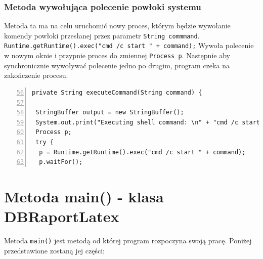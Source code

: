 \subsubsection*{Metoda wywołująca polecenie powłoki systemu}


Metoda ta ma na celu uruchomić nowy proces, którym będzie wywołanie komendy powłoki przesłanej przez parametr \texttt{String commmand}. \texttt{Runtime.getRuntime().exec("cmd /c start " + command);} Wywoła polecenie w nowym oknie i przypnie proces do zmiennej \texttt{Process p}. Następnie aby synchronicznie wywoływać polecenie jedno po drugim, program czeka na zakończenie procesu. 

 \begin{lstlisting}[numbers=left,firstnumber=56]
private String executeCommand(String command) {
 
 StringBuffer output = new StringBuffer();
 System.out.print("Executing shell command: \n" + "cmd /c start " + command);
 Process p;
 try {
  p = Runtime.getRuntime().exec("cmd /c start " + command);
  p.waitFor();

\end{lstlisting}

\section{Metoda main() - klasa DBRaportLatex }

Metoda \texttt{main()} jest metodą od której program rozpoczyna swoją pracę. Poniżej przedstawione zostaną jej części:

